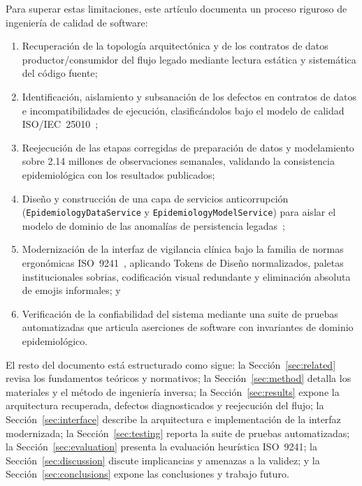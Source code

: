 \documentclass[conference]{IEEEtran}
\begin{document}
Para superar estas limitaciones, este art\'iculo documenta un proceso riguroso de ingenier\'ia de calidad de software:
\begin{enumerate}
  \item Recuperaci\'on de la topolog\'ia arquitect\'onica y de los contratos de datos productor/consumidor del flujo legado mediante lectura est\'atica y sistem\'atica del c\'odigo fuente;
  \item Identificaci\'on, aislamiento y subsanaci\'on de los defectos en contratos de datos e incompatibilidades de ejecuci\'on, clasific\'andolos bajo el modelo de calidad ISO/IEC~25010~\cite{ISO25010};
  \item Reejecuci\'on de las etapas corregidas de preparaci\'on de datos y modelamiento sobre 2.14 millones de observaciones semanales, validando la consistencia epidemiol\'ogica con los resultados publicados;
  \item Dise\~no y construcci\'on de una capa de servicios anticorrupci\'on (\texttt{EpidemiologyDataService} y \texttt{EpidemiologyModelService}) para aislar el modelo de dominio de las anomal\'ias de persistencia legadas~\cite{Evans2003};
  \item Modernizaci\'on de la interfaz de vigilancia cl\'inica bajo la familia de normas ergon\'omicas ISO~9241~\cite{ISO9241-11, ISO9241-210, ISO9241-110, ISO9241-12}, aplicando Tokens de Dise\~no normalizados, paletas institucionales sobrias, codificaci\'on visual redundante y eliminaci\'on absoluta de emojis informales; y
  \item Verificaci\'on de la confiabilidad del sistema mediante una suite de pruebas automatizadas que articula aserciones de software con invariantes de dominio epidemiol\'ogico.
\end{enumerate}

El resto del documento est\'a estructurado como sigue: la Secci\'on~\ref{sec:related} revisa los fundamentos te\'oricos y normativos; la Secci\'on~\ref{sec:method} detalla los materiales y el m\'etodo de ingenier\'ia inversa; la Secci\'on~\ref{sec:results} expone la arquitectura recuperada, defectos diagnosticados y reejecuci\'on del flujo; la Secci\'on~\ref{sec:interface} describe la arquitectura e implementaci\'on de la interfaz modernizada; la Secci\'on~\ref{sec:testing} reporta la suite de pruebas automatizadas; la Secci\'on~\ref{sec:evaluation} presenta la evaluaci\'on heur\'istica ISO~9241; la Secci\'on~\ref{sec:discussion} discute implicancias y amenazas a la validez; y la Secci\'on~\ref{sec:conclusions} expone las conclusiones y trabajo futuro.
\end{document}
